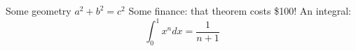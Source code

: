 Some geometry
$a^2 + b^2 = c^2$
Some finance: that theorem costs \$100!
An integral:
\[
\int_0^1 x^n dx = \frac{1}{n+1}
\]
